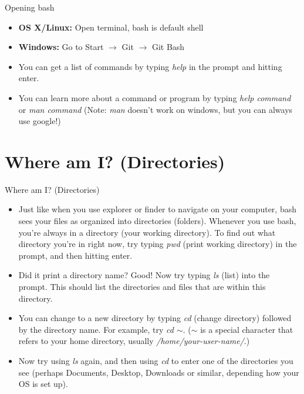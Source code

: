 \documentclass{beamer}
\begin{document}
\begin{frame}[fragile]{Opening bash}
\begin{itemize}
    \item<1-> \textbf{OS X/Linux:} Open terminal, bash is default shell
    \item<1-> \textbf{Windows:} Go to Start $\rightarrow$ Git $\rightarrow$ Git Bash
    \item<2-> You can get a list of commands by typing \emph{help} in the prompt and hitting enter.
    \item<3-> You can learn more about a command or program by typing \emph{help \textit{command}} or \emph{man \textit{command}} (Note: \emph{man} doesn't work on windows, but you can always use google!)
\end{itemize}
\end{frame}

\section{Where am I? (Directories)}
\begin{frame}{Where am I? (Directories)}
\begin{itemize}
    \item<1-> Just like when you use explorer or finder to navigate on your computer, bash sees your files as organized into directories (folders). Whenever you use bash, you're always in a directory (your working directory). To find out what directory you're in right now, try typing \emph{pwd} (print working directory) in the prompt, and then hitting enter.
    \item<2-> Did it print a directory name? Good! Now try typing \emph{ls} (list) into the prompt. This should list the directories and files that are within this directory. 
    \item<3-> You can change to a new directory by typing \emph{cd} (change directory) followed by the directory name. For example, try \emph{cd $\sim$}. (\emph{$\sim$} is a special character that refers to your home directory, usually \textit{/home/your-user-name/}.) 
    \item<4-> Now try using \emph{ls} again, and then using \emph{cd} to enter one of the directories you see (perhaps Documents, Desktop, Downloads or similar, depending how your OS is set up).
\end{itemize}
\end{frame}
\end{document}

